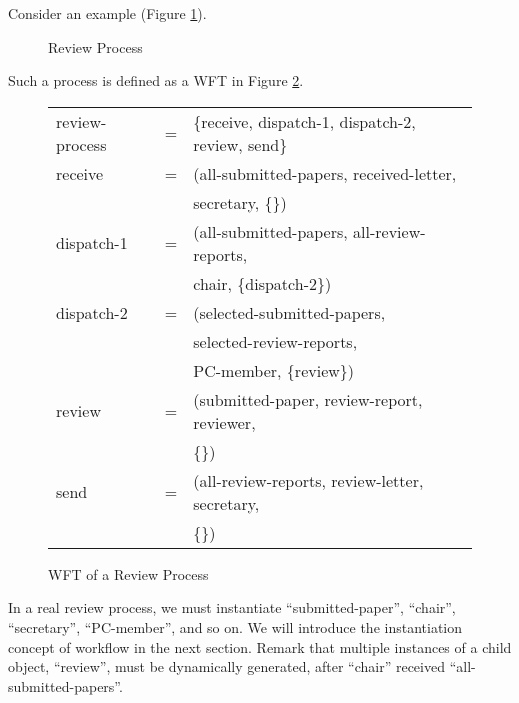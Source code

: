 Consider an example (Figure \ref{f:review}).
\begin{figure}
{\small 
\begin{center}
 \setlength{\unitlength}{0.82mm}
 
\end{center}
 }
\caption{Review Process}\label{f:review}
\end{figure}
Such a process is defined as a WFT in Figure \ref{f:wft}.
\begin{figure}
 \begin{center}
  \begin{tabular}{lcl}
   review-process & = & \{receive, dispatch-1, dispatch-2, review, send\}\\
   receive & = & (all-submitted-papers, received-letter, \\
   &   &  secretary, \{\})\\
   dispatch-1 & = & (all-submitted-papers, all-review-reports, \\
   &   & chair, \{dispatch-2\})\\
   dispatch-2 & = & (selected-submitted-papers, \\
   &   & selected-review-reports, \\
   &   & PC-member, \{review\})\\
   review & = & (submitted-paper,     review-report,     reviewer, \\
   &   & \{\})\\
   send   & = & (all-review-reports, review-letter, secretary, \\
   &   & \{\})
  \end{tabular} 
 \end{center}
 \caption{WFT of a Review Process}\label{f:wft}
\end{figure}
In a real review process, we must instantiate ``submitted-paper'',
``chair'', ``secretary'', ``PC-member'', and so on.  We will introduce
the instantiation concept of workflow in the next section.
Remark that multiple instances of a child object, ``review'', must be 
dynamically generated, after ``chair'' received ``all-submitted-papers''.

